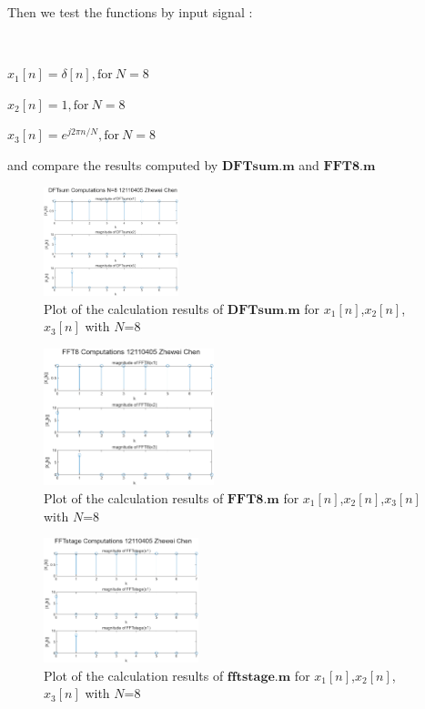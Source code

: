 \documentclass[journal]{IEEEtran}
\begin{document}
Then we test the functions by input signal :

$~$

$x_1[n]=\delta[n], \text{for}\ N=8$

$x_2[n]=1, \text{for}\ N=8$

$x_3[n]=e^{j2\pi n/N}, \text{for}\ N=8$

and compare the results computed by $\mathbf{DFTsum.m}$ and $\mathbf{FFT8.m}$ 


\begin{figure}[htbp]
   \centering
   \includegraphics[width=0.35\textwidth]{5321.png} %
\caption{Plot of the calculation results of $\mathbf{DFTsum.m}$ for $x_1[n]$,$x_2[n]$,$x_3[n]$ with $N$=8}
   \label{fig:7}
\end{figure}

\begin{figure}[htbp]
   \centering
   \includegraphics[width=0.44\textwidth]{5322.png} %
\caption{Plot of the calculation results of $\mathbf{FFT8.m}$ for $x_1[n]$,$x_2[n]$,$x_3[n]$ with $N$=8}
   \label{fig:8}
 \end{figure}


 \begin{figure}[htbp]
   \centering
   \includegraphics[width=0.4\textwidth]{5323.png} %
\caption{Plot of the calculation results of $\mathbf{fftstage.m}$ for $x_1[n]$,$x_2[n]$,$x_3[n]$ with $N$=8}
   \label{fig:9}
 \end{figure}
\end{document}
